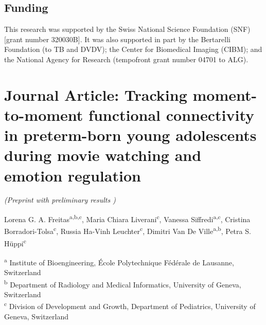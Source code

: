 \subsection*{Funding}
This research was supported by the Swiss National Science Foundation (SNF) [grant number 320030B]. It was also supported in part by the Bertarelli Foundation (to TB and DVDV); the Center for Biomedical Imaging (CIBM); and the National Agency for Research (tempofront grant number 04701 to ALG).




\clearpage

\section{Journal Article: Tracking moment-to-moment functional connectivity in preterm-born young adolescents during movie watching and emotion regulation}\label{section:ppicaps_preterm}

\begin{center}
 \textit{(Preprint with preliminary results )}
 
Lorena G. A. Freitas\textsuperscript{a,b,c}, 
Maria Chiara Liverani\textsuperscript{c}, 
Vanessa Siffredi\textsuperscript{a,c}, 
Cristina Borradori-Tolsa\textsuperscript{c}, 
Russia Ha-Vinh Leuchter\textsuperscript{c},
Dimitri Van De Ville\textsuperscript{a,b},
Petra S. Hüppi\textsuperscript{c}
\end{center}
\textsuperscript{a} Institute of Bioengineering, École Polytechnique Fédérale de Lausanne, Switzerland \\
\textsuperscript{b} Department of Radiology and Medical Informatics, University of Geneva, Switzerland \\
\textsuperscript{c} Division of Development and Growth, Department of Pediatrics, University of Geneva, Switzerland \\

